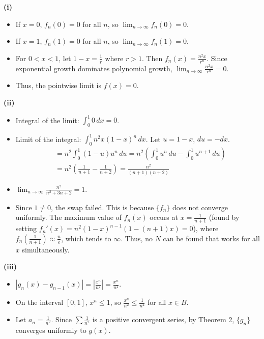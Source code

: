 \begin{solution}

\textbf{(i)} 
\begin{itemize}
    \item If $x = 0$, $f_n(0) = 0$ for all $n$, so $\lim_{n \to \infty} f_n(0) = 0$.
    \item If $x = 1$, $f_n(1) = 0$ for all $n$, so $\lim_{n \to \infty} f_n(1) = 0$.
    \item For $0 < x < 1$, let $1-x = \frac{1}{r}$ where $r > 1$. Then $f_n(x) = \frac{n^2 x}{r^n}$. Since exponential growth dominates polynomial growth, $\lim_{n \to \infty} \frac{n^2 x}{r^n} = 0$.
    \item Thus, the pointwise limit is $f(x) = 0$.
\end{itemize}

\textbf{(ii)} 
\begin{itemize}
    \item Integral of the limit: $\int_0^1 0 \, dx = 0$.
    \item Limit of the integral: 
    $\int_0^1 n^2 x (1-x)^n \, dx$. Let $u = 1-x$, $du = -dx$.
    \begin{align*}
    &= n^2 \int_0^1 (1-u)u^n \, du = n^2 \left( \int_0^1 u^n \, du - \int_0^1 u^{n+1} \, du \right)\\
    &= n^2 \left( \frac{1}{n+1} - \frac{1}{n+2} \right) = \frac{n^2}{(n+1)(n+2)}
    \end{align*}
    \item $\lim_{n \to \infty} \frac{n^2}{n^2+3n+2} = 1$.
    \item Since $1 \neq 0$, the swap failed. This is because $\{f_n\}$ does not converge uniformly. The maximum value of $f_n(x)$ occurs at $x = \frac{1}{n+1}$ (found by setting $f_n'(x) = n^2(1-x)^{n-1}(1 - (n+1)x) = 0$), where $f_n(\frac{1}{n+1}) \approx \frac{n}{e}$, which tends to $\infty$. Thus, no $N$ can be found that works for all $x$ simultaneously.
\end{itemize}

\textbf{(iii)} 
\begin{itemize}
    \item $|g_n(x) - g_{n-1}(x)| = \left| \frac{x^n}{n^2} \right| = \frac{x^n}{n^2}$.
    \item On the interval $[0, 1]$, $x^n \leq 1$, so $\frac{x^n}{n^2} \leq \frac{1}{n^2}$ for all $x \in B$.
    \item Let $a_n = \frac{1}{n^2}$. Since $\sum \frac{1}{n^2}$ is a positive convergent series, by Theorem 2, $\{g_n\}$ converges uniformly to $g(x)$.
\end{itemize}


\end{solution}
